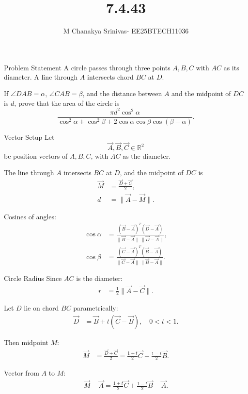 \documentclass{beamer}
\title %
{7.4.43}
\date{}
\author %
{M Chanakya Srinivas- EE25BTECH11036}
\begin{document}
\frame{\titlepage}



\begin{frame}{Problem Statement}
A circle passes through three points $A, B, C$ with $AC$ as its diameter.  
A line through $A$ intersects chord $BC$ at $D$.  

If $\angle DAB = \alpha$, $\angle CAB = \beta$, and the distance between $A$ and the midpoint of $DC$ is $d$, prove that the area of the circle is
\[
\frac{\pi d^2 \cos^2 \alpha}{\cos^2 \alpha + \cos^2 \beta + 2 \cos \alpha \cos \beta \cos(\beta - \alpha)}.
\]
\end{frame}

\begin{frame}{Vector Setup}
Let
\[
\vec{A}, \vec{B}, \vec{C} \in \mathbb{R}^2
\]
be position vectors of $A,B,C$, with $AC$ as the diameter.  

The line through $A$ intersects $BC$ at $D$, and the midpoint of $DC$ is
\begin{align}
\vec{M} &= \frac{\vec{D} + \vec{C}}{2}, \\
d &= \|\vec{A} - \vec{M}\|.
\end{align}

Cosines of angles:
\begin{align}
\cos \alpha &= \frac{(\vec{B}-\vec{A})^T (\vec{D}-\vec{A})}{\|\vec{B}-\vec{A}\| \, \|\vec{D}-\vec{A}\|},\\
\cos \beta &= \frac{(\vec{C}-\vec{A})^T (\vec{B}-\vec{A})}{\|\vec{C}-\vec{A}\| \, \|\vec{B}-\vec{A}\|}.
\end{align}
\end{frame}

\begin{frame}{Circle Radius}
Since $AC$ is the diameter:
\begin{align}
r &= \frac{1}{2} \|\vec{A}-\vec{C}\|.
\end{align}

Let $D$ lie on chord $BC$ parametrically:
\begin{align}
\vec{D} &= \vec{B} + t (\vec{C}-\vec{B}), \quad 0 < t < 1.
\end{align}

Then midpoint $M$:
\begin{align}
\vec{M} &= \frac{\vec{D} + \vec{C}}{2} = \frac{1+t}{2}\vec{C} + \frac{1-t}{2}\vec{B}.
\end{align}

Vector from $A$ to $M$:
\begin{align}
\vec{M} - \vec{A} = \frac{1+t}{2}\vec{C} + \frac{1-t}{2}\vec{B} - \vec{A}.
\end{align}
\end{frame}
\end{document}
